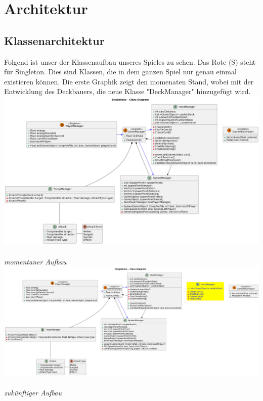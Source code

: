 \chapter{Architektur}

\section{Klassenarchitektur}
Folgend ist unser der Klassenaufbau unseres Spieles zu sehen.
Das Rote (S) steht für Singleton.
Dies sind Klassen, die in dem ganzen Spiel nur genau einmal existieren können.
Die erste Graphik zeigt den momenaten Stand, wobei mit der Entwicklung des Deckbauers, die neue Klasse "DeckManager" hinzugefügt wird. \\
\includegraphics[width=15cm]{resources/Singletons.png} \\
\textit{momentaner Aufbau} \\
\includegraphics[width=15cm]{resources/Singletons 2.png} \\
\textit{zukünftiger Aufbau}

